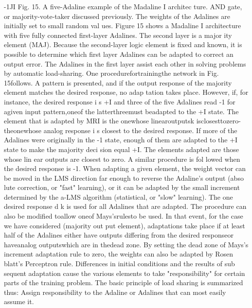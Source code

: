 \documentclass[11pt,a4paper,twocolumn]{article}
\begin{document}
{-1JI 
Fig. 15. A five-Adaline example of the Madaline I architec
ture. 
AND gate, or majority-vote-taker discussed previously. The 
weights of the Adalines are initially set to small random val
ues. 
Figure 15 shows a Madaline I architecture with five fully 
connected first-layer Adalines. The second layer is a major
ity element (MAJ). Because the second-layer logic element 
is fixed and known, it is possible to determine which first
layer Adalines can be adapted to correct an output error. 
The Adalines in the first layer assist each other in solving 
problems by automatic load-sharing. 
One procedurefortrainingthe network in Fig. 15follows. 
A pattern is presented, and if the output response of the 
majority element matches the desired response, no adap
tation takes place. However, if, for instance, the desired 
response i s  +I 
and three of the five Adalines read -1 for 
agiven input pattern,oneof the latterthreemust beadapted 
to the +I 
state. The element that is adapted by MRI is the 
onewhose linearoutputsk isclosesttozero-theonewhose 
analog response i s  closest to the desired response. If more 
of the Adalines were originally in the -1 state, enough of 
them are adapted to the +I 
state to make the majority deci
sion equal +I. The elements adapted are those whose lin
ear outputs are closest to zero. A similar procedure is fol
lowed when the desired response is -1. When adapting a 
given element, the weight vector can be moved in the LMS 
direction far enough to reverse the Adaline's output (abso
lute correction, or "fast" learning), or it can be adapted by 
the small increment determined by the a-LMS algorithm 
(statistical, or "slow" learning). The one desired response 
d k  is used for all Adalines that are adapted. The procedure 
can also be modified toallow oneof Mays'srulesto be used. 
In that event, for the case we have considered (majority out
put element), adaptations take place if at least half of the 
Adalines either have outputs differing from the desired 
responseor haveanalog outputswhich are in thedead zone. 
By setting the dead zone of Mays's increment adaptation 
rule to zero, the weights can also be adapted by Rosen
blatt's Perceptron rule. 
Differences in initial conditions and the results of sub
sequent adaptation cause the various elements to take 
"responsibility" for certain parts of the training problem. 
The basic principle of load sharing is summarized thus: 
Assign responsibility to the Adaline or Adalines that can 
most easily assume it. 




}
\end{document}
